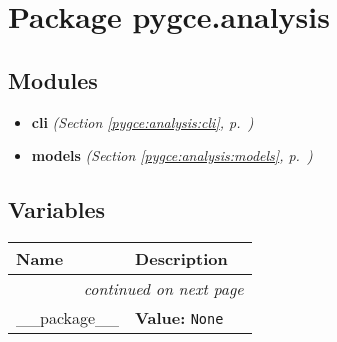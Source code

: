 %
%
%


\section{Package pygce.analysis}

    \label{pygce:analysis}


\subsection{Modules}

\begin{itemize}
\setlength{\parskip}{0ex}
\item \textbf{cli}
  \textit{(Section \ref{pygce:analysis:cli}, p.~\pageref{pygce:analysis:cli})}

\item \textbf{models}
  \textit{(Section \ref{pygce:analysis:models}, p.~\pageref{pygce:analysis:models})}

\end{itemize}



  \subsection{Variables}

    \vspace{-1cm}
\hspace{\varindent}\begin{longtable}{|p{\varnamewidth}|p{\vardescrwidth}|l}
\cline{1-2}
\cline{1-2} \centering \textbf{Name} & \centering \textbf{Description}& \\
\cline{1-2}
\endhead\cline{1-2}\multicolumn{3}{r}{\small\textit{continued on next page}}\\\endfoot\cline{1-2}
\endlastfoot\raggedright \_\-\_\-p\-a\-c\-k\-a\-g\-e\-\_\-\_\- & \raggedright \textbf{Value:} 
{\tt None}&\\
\cline{1-2}
\end{longtable}

